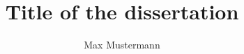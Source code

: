 \title{Title of the dissertation}
\author{Max Mustermann}
\newcommand{\homecountryofphd}{Deutschland}
\newcommand{\firstreviewer}{Prof. Dr. Ulrike Lechner}
\newcommand{\secondreviewer}{Prof. Dr. XX}